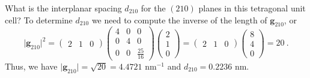 \begin{example}
What is the interplanar spacing $d_{210}$ for the $(210)$ planes in this tetragonal unit cell?  To determine $d_{210}$ we need to compute the inverse of the length of $\mathbf{g}_{210}$, or
\[
	\vert\mathbf{g}_{210}\vert^2 = \begin{pmatrix}2& 1 & 0\end{pmatrix}
			\begin{pmatrix}
			4 & 0 & 0\\
			0 & 4 & 0\\
			0 & 0 & \frac{25}{16}\end{pmatrix}
			\begin{pmatrix}2 \\ 1 \\ 0\end{pmatrix}=  \begin{pmatrix}2& 1 & 0\end{pmatrix}
			\begin{pmatrix}8 \\ 4 \\ 0\end{pmatrix}= 20\ .
\]
Thus, we have $\vert\mathbf{g}_{210}\vert = \sqrt{20} = 4.4721$ nm$^{-1}$ and $d_{210} = 0.2236$ nm.
\end{example}


